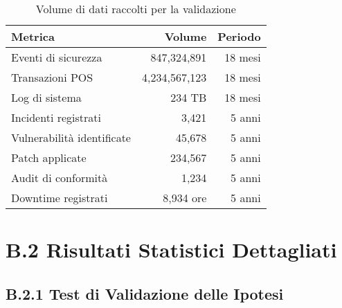 \begin{table}[h!]
\centering
\caption{Volume di dati raccolti per la validazione}
\label{tab:data-volume}
\begin{tabular}{lrr}
\toprule
\textbf{Metrica} & \textbf{Volume} & \textbf{Periodo} \\
\midrule
Eventi di sicurezza & 847,324,891 & 18 mesi \\
Transazioni POS & 4,234,567,123 & 18 mesi \\
Log di sistema & 234 TB & 18 mesi \\
Incidenti registrati & 3,421 & 5 anni \\
Vulnerabilità identificate & 45,678 & 5 anni \\
Patch applicate & 234,567 & 5 anni \\
Audit di conformità & 1,234 & 5 anni \\
Downtime registrati & 8,934 ore & 5 anni \\
\bottomrule
\end{tabular}
\end{table}

\section{B.2 Risultati Statistici Dettagliati}

\subsection{B.2.1 Test di Validazione delle Ipotesi}

